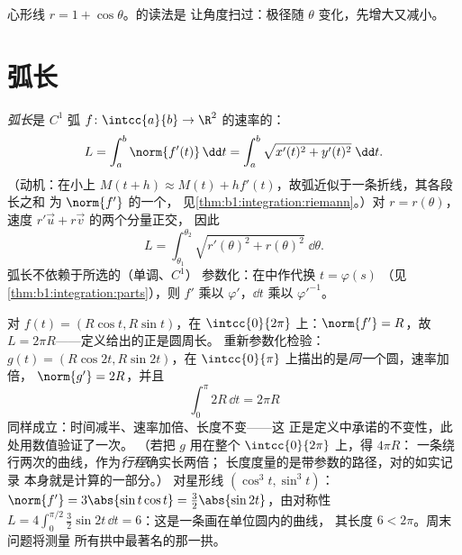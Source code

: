 \begin{omfigure}

{\small 心形线 $r = 1 + \cos\theta$。的读法是
让角度扫过：极径随 $\theta$
变化，先增大又减小。}
\end{omfigure}

\section{弧长}

\begin{definition}[弧长]\label{def:b1:curves:arclength}
\emph{弧长}是 $C^1$ 弧 $f \colon
\intcc{a}{b} \to \R^2$ 的速率的：
\[
L = \int_a^b \norm{f'(t)}\,\dd t
= \int_a^b \sqrt{x'(t)^2 + y'(t)^2}\;\dd t .
\]
（动机：在小上 $M(t + h) \approx M(t) + h
f'(t)$，故弧近似于一条折线，其各段长之和
为 $\norm{f'}$ 的一个，
见\cref{thm:b1:integration:riemann}。）对 $r =
r(\theta)$，速度 $r'\vec u + r\vec v$ 的两个分量正交，
因此
\[
L = \int_{\theta_1}^{\theta_2}
\sqrt{r'(\theta)^2 + r(\theta)^2}\;\dd\theta .
\]
弧长不依赖于所选的（单调、$C^1$）
参数化：在中作代换 $t = \varphi(s)$
（见\cref{thm:b1:integration:parts}），则 $f'$ 乘以
$\varphi'$，$\dd t$ 乘以 $\varphi'^{-1}$。
\end{definition}

\begin{example}[检验：圆]\label{ex:b1:curves:circlelength}
对 $f(t) = (R\cos t, R\sin t)$，在 $\intcc{0}{2\pi}$ 上：$\norm{f'} =
R$，故 $L = 2\pi R$——定义给出的正是圆周长。
重新参数化检验： $g(t) = (R\cos 2t, R\sin 2t)$，在
$\intcc{0}{\pi}$ 上描出的是\emph{同一}个圆，速率加倍，
$\norm{g'} = 2R$，并且
\[
\int_0^{\pi} 2R\,\dd t = 2\pi R
\]
同样成立：时间减半、速率加倍、长度不变——这
正是定义中承诺的不变性，此处用数值验证了一次。
（若把 $g$ 用在整个 $\intcc{0}{2\pi}$ 上，得 $4\pi R$：
一条绕行两次的曲线，作为\emph{行程}确实长两倍；
长度度量的是带参数的路径，对的如实记录
本身就是计算的一部分。）
对星形线 $(\cos^3t, \sin^3t)$：$\norm{f'} = 3\abs{\sin
t\cos t} = \tfrac32\abs{\sin 2t}$，由对称性 $L = 4\int_0^{\pi/2}
\tfrac32\sin 2t\,\dd t = 6$：这是一条画在单位圆内的曲线，
其长度 $6 < 2\pi$。周末问题将测量
所有拱中最著名的那一拱。
\end{example}


